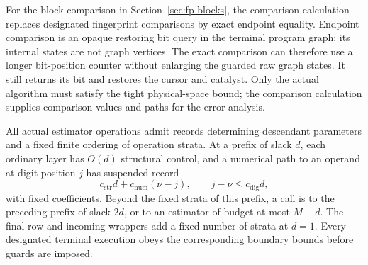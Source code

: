 For the block comparison in Section~\ref{sec:fp-blocks}, the comparison
calculation replaces designated fingerprint comparisons by exact endpoint
equality.  Endpoint comparison is an opaque restoring bit query in the
terminal program graph: its internal states are not graph vertices.
The exact comparison can therefore use a longer bit-position counter
without enlarging the guarded raw graph states.  It still returns its
bit and restores the cursor and catalyst.  Only the actual algorithm
must satisfy the tight physical-space bound; the comparison calculation
supplies comparison values and paths for the error analysis.

\begin{lemma}\label{lem:ctrl-recipes}
All actual estimator operations admit records determining descendant parameters and a fixed
finite ordering of operation strata.  At a prefix of slack $d$, each
ordinary layer has $O(d)$ structural control, and a numerical path to an
operand at digit position $j$ has suspended record
\begin{equation}\label{eq:ctrl-recipe-bound}
 c_{\mathrm{str}}d+c_{\mathrm{num}}(\nu-j),\qquad
 j-\nu\le c_{\mathrm{dig}}d,
\end{equation}
with fixed coefficients.  Beyond the fixed strata of this prefix, a
call is to the preceding prefix of slack $2d$, or to an estimator of
budget at most $M-d$.  The final row and incoming wrappers add a fixed
number of strata at $d=1$.  Every designated terminal execution obeys
the corresponding boundary bounds before guards are imposed.
\end{lemma}

